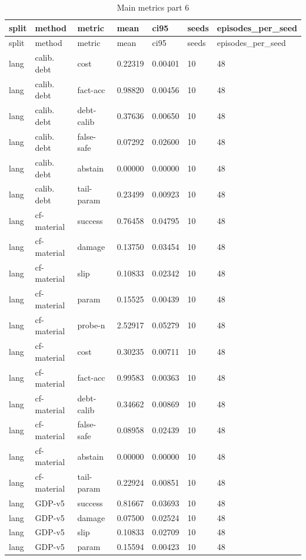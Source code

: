\documentclass{article}
\begin{document}
\begin{center}
\tiny
\renewcommand{\arraystretch}{0.92}
\setlength{\tabcolsep}{3pt}
\begin{longtable}{lllllll}
\caption{Main metrics part 6}\label{tab:main-metrics-6}\\
\toprule
split & method & metric & mean & ci95 & seeds & episodes\_per\_seed \\
\midrule
\endfirsthead
\toprule
split & method & metric & mean & ci95 & seeds & episodes\_per\_seed \\
\midrule
\endhead
lang & calib. debt & cost & 0.22319 & 0.00401 & 10 & 48 \\
lang & calib. debt & fact-acc & 0.98820 & 0.00456 & 10 & 48 \\
lang & calib. debt & debt-calib & 0.37636 & 0.00650 & 10 & 48 \\
lang & calib. debt & false-safe & 0.07292 & 0.02600 & 10 & 48 \\
lang & calib. debt & abstain & 0.00000 & 0.00000 & 10 & 48 \\
lang & calib. debt & tail-param & 0.23499 & 0.00923 & 10 & 48 \\
lang & cf-material & success & 0.76458 & 0.04795 & 10 & 48 \\
lang & cf-material & damage & 0.13750 & 0.03454 & 10 & 48 \\
lang & cf-material & slip & 0.10833 & 0.02342 & 10 & 48 \\
lang & cf-material & param & 0.15525 & 0.00439 & 10 & 48 \\
lang & cf-material & probe-n & 2.52917 & 0.05279 & 10 & 48 \\
lang & cf-material & cost & 0.30235 & 0.00711 & 10 & 48 \\
lang & cf-material & fact-acc & 0.99583 & 0.00363 & 10 & 48 \\
lang & cf-material & debt-calib & 0.34662 & 0.00869 & 10 & 48 \\
lang & cf-material & false-safe & 0.08958 & 0.02439 & 10 & 48 \\
lang & cf-material & abstain & 0.00000 & 0.00000 & 10 & 48 \\
lang & cf-material & tail-param & 0.22924 & 0.00851 & 10 & 48 \\
lang & GDP-v5 & success & 0.81667 & 0.03693 & 10 & 48 \\
lang & GDP-v5 & damage & 0.07500 & 0.02524 & 10 & 48 \\
lang & GDP-v5 & slip & 0.10833 & 0.02709 & 10 & 48 \\
lang & GDP-v5 & param & 0.15594 & 0.00423 & 10 & 48 \\

\end{longtable}
\end{center}
\end{document}
